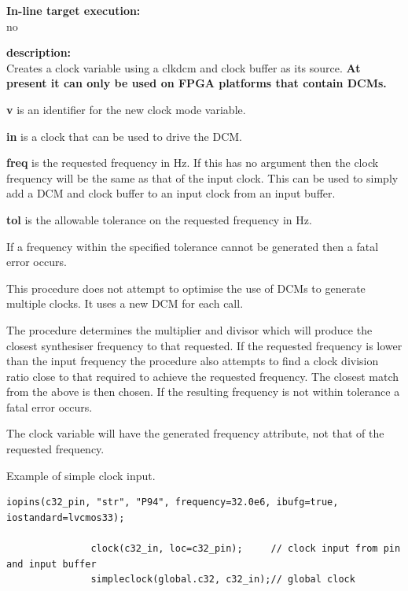             {\bf In-line target execution:} \\
            no

            {\bf description:} \\
            Creates a clock variable using a clkdcm and clock buffer as its source.
            {\bf At present it can only be used on FPGA platforms that contain DCMs.}
            
            {\bf v} is an identifier for the new clock mode variable.
            
            {\bf in} is a clock that can be used to drive the DCM.
            
            {\bf freq} is the requested frequency in Hz. If this has no argument
            then the clock frequency will be the same as that of the input clock.
            This can be used to simply add a DCM and clock buffer to an input clock
            from an input buffer.

            {\bf tol} is the allowable tolerance on the requested frequency in Hz.

            If a frequency within the specified tolerance cannot be generated then
            a fatal error occurs.

            This procedure does not attempt to optimise the use of DCMs to generate
            multiple clocks. It uses a new DCM for each call.
            
            The procedure determines the multiplier and divisor which will produce
            the closest synthesiser frequency to that requested. If the requested
            frequency is lower than the input frequency the procedure also attempts
            to find a clock division ratio close to that required to achieve the
            requested frequency. The closest match from the above is then chosen. If
            the resulting frequency is not within tolerance a fatal error occurs.
            
            The clock variable will have the generated frequency attribute, not
            that of the requested frequency.
            
            Example of simple clock input.

            \begin{lstlisting}[gobble=12, language=threepl]
               iopins(c32_pin, "str", "P94", frequency=32.0e6, ibufg=true, iostandard=lvcmos33);

               clock(c32_in, loc=c32_pin);     // clock input from pin and input buffer
               simpleclock(global.c32, c32_in);// global clock
            \end{lstlisting}



